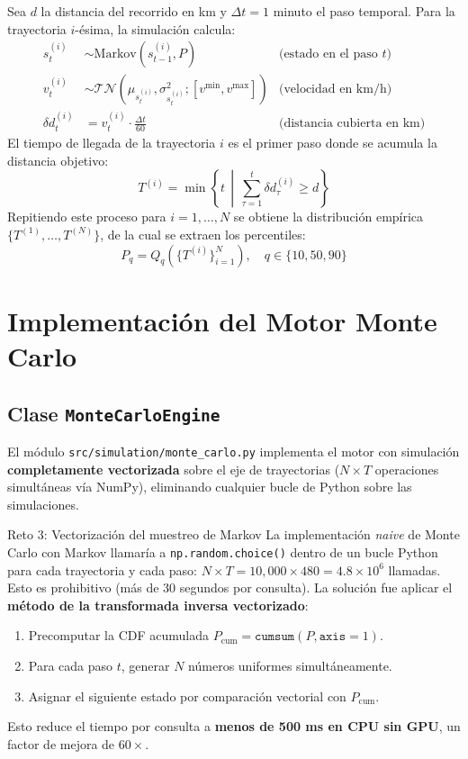 \documentclass[11pt,a4paper]{article}
\begin{document}
Sea $d$ la distancia del recorrido en km y $\Delta t = 1$ minuto el paso temporal. Para la trayectoria $i$-ésima, la simulación calcula:
\begin{align}
s_t^{(i)} &\sim \text{Markov}\left(s_{t-1}^{(i)}, P\right) & \text{(estado en el paso $t$)} \\
v_t^{(i)} &\sim \mathcal{TN}\left(\mu_{s_t^{(i)}}, \sigma_{s_t^{(i)}}^2; [v^\text{min}, v^\text{max}]\right) & \text{(velocidad en km/h)} \\
\delta d_t^{(i)} &= v_t^{(i)} \cdot \frac{\Delta t}{60} & \text{(distancia cubierta en km)}
\end{align}
El tiempo de llegada de la trayectoria $i$ es el primer paso donde se acumula la distancia objetivo:
\begin{equation}
T^{(i)} = \min\left\{ t \,\middle|\, \sum_{\tau=1}^{t} \delta d_\tau^{(i)} \geq d \right\}
\label{eq:tiempollegada}
\end{equation}
Repitiendo este proceso para $i = 1, \ldots, N$ se obtiene la distribución empírica $\{T^{(1)}, \ldots, T^{(N)}\}$, de la cual se extraen los percentiles:
\begin{equation}
P_q = Q_q\left(\{T^{(i)}\}_{i=1}^{N}\right), \quad q \in \{10, 50, 90\}
\end{equation}

\section{Implementación del Motor Monte Carlo}

\subsection{Clase \texttt{MonteCarloEngine}}

El módulo \texttt{src/simulation/monte\_carlo.py} implementa el motor con simulación \textbf{completamente vectorizada} sobre el eje de trayectorias ($N \times T$ operaciones simultáneas vía NumPy), eliminando cualquier bucle de Python sobre las simulaciones.

\begin{challengebox}{Reto 3: Vectorización del muestreo de Markov}
La implementación \textit{naive} de Monte Carlo con Markov llamaría a \texttt{np.random.choice()} dentro de un bucle Python para cada trayectoria y cada paso: $N \times T = 10{,}000 \times 480 = 4.8 \times 10^6$ llamadas. Esto es prohibitivo (más de 30 segundos por consulta). La solución fue aplicar el \textbf{método de la transformada inversa vectorizado}:
\begin{enumerate}[leftmargin=*,noitemsep]
\item Precomputar la CDF acumulada $P_\text{cum} = \texttt{cumsum}(P, \texttt{axis}=1)$.
\item Para cada paso $t$, generar $N$ números uniformes simultáneamente.
\item Asignar el siguiente estado por comparación vectorial con $P_\text{cum}$.
\end{enumerate}
Esto reduce el tiempo por consulta a \textbf{menos de 500 ms en CPU sin GPU}, un factor de mejora de $60\times$.
\end{challengebox}
\end{document}
